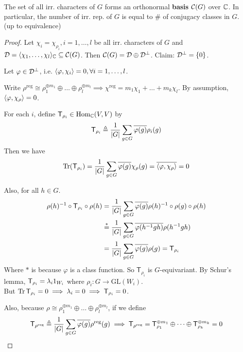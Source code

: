 \begin{theorem}
  The set of all irr. characters of $G$ forms an orthonormal {\bf basis}
  $\mathcal{C}(G)$ over $\mathbb{C}$. In particular, the number of irr. rep. of $G$ is equal
  to \# of conjugacy classes in $G$. (up to equivalence)

  \begin{proof}
    Let $\chi_i = \chi_{\rho_i}, i = 1, \dots, l$ be all irr.
    characters of $G$ and $\mathcal{D} = \langle\chi_1, \dots, \chi_l\rangle_{\mathbb{C}}
    \subseteq \mathcal{C}(G)$. Then $\mathcal{C}(G) = \mathcal{D} \oplus \mathcal{D}^\perp$.
    Claim: $\mathcal{D}^\perp = \{0\}$.

    Let $\varphi \in \mathcal{D}^\perp$, i.e. $\langle\varphi, \chi_i\rangle = 0,
    \forall i = 1,\dots, l$.

    Write $\rho^{\text{reg}} \cong \rho_1^{\oplus m_1} \oplus\dots\oplus\rho_l^{\oplus m_l}
    \implies \chi^{\text{reg}} = m_1\chi_1 + \dots + m_k\chi_l$.
    By assumption, $\langle\varphi, \chi_\rho\rangle = 0$.

    For each $i$, define ${\sf T}_{\rho_i} \in \operatorname{Hom}_{\mathbb{C}}(V, V)$ by
      \[
        {\sf T}_{\rho_i} \triangleq
        \frac{1}{\lvert G\rvert} \sum_{g\in G} \overline{\varphi(g)} \rho_i(g)
      \] 
    Then we have
      \[
        \operatorname{Tr}({\sf T}_{\rho_i}) =
        \frac{1}{\lvert G\rvert} \sum_{g\in G} \overline{\varphi(g)} \chi_\rho(g)
        = \overline{\langle\varphi, \chi_\rho\rangle} = 0
      \]

      Also, for all $h \in G$.
      \begin{align*}
        \rho(h)^{-1}\circ{\sf T}_{\rho_i} \circ\rho(h)
        &= \frac{1}{\lvert G\rvert} \sum_{g\in G}
        \overline{\varphi(g)} \rho(h)^{-1}\circ\rho(g)\circ\rho(h) \\
        & \stackrel{*}{=} \frac{1}{\lvert G\rvert} \sum_{g \in G} \overline{\varphi(h^{-1} g h)} \rho(h^{-1}gh) \\
        & = \frac{1}{\lvert G\rvert} \sum_{g \in G} \overline{\varphi(g)} \rho(g) = \mathsf{T}_{\rho_i}
      \end{align*}
      Where $*$ is because $\varphi$ is a class function.  So $\mathsf{T}_{\rho_i}$ is $G$-equivariant.
      By Schur's lemma,
      ${\sf T}_{\rho_i} = \lambda_i 1_{W_i}$ where
      $\rho_i: G\to \text{GL}(W_i)$. \\
      But $\operatorname{Tr}{{\sf T}_{\rho_i}} = 0 \implies \lambda_i = 0
      \implies {\sf T}_{\rho_i} = 0$.

      Also, because $\rho \cong \rho_1^{\oplus m_1} \oplus\dots\oplus\rho_l^{\oplus m_l}$,
      if we define
      \[
        {\sf T}_{\rho^{\text{reg}}} \triangleq
        \frac{1}{\lvert G\rvert} \sum_{g\in G} \overline{\varphi(g)} \rho^{\text{reg}}(g)
        \implies \mathsf{T}_{\rho^{\text{reg}}}
        = \mathsf{T}^{\oplus m_1}_{\rho_1} \oplus \cdots \oplus
        \mathsf{T}^{\oplus m_k}_{\rho_k} = 0
      \] 


\end{proof}
\end{theorem}
